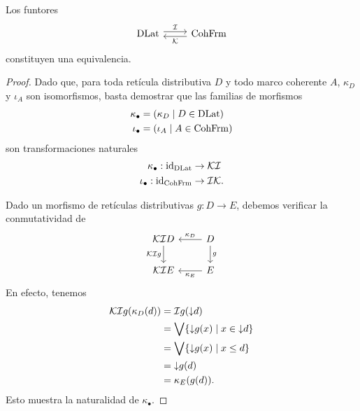 \begin{thm}
    Los funtores
    \[
        \begin{tikzcd}
            \DLat \ar[r,"\cal I",shift left] &
            \CohFrm \ar[l,"\cal K",shift left]
        \end{tikzcd}
    \]
    constituyen una equivalencia.
\end{thm}
\begin{proof}
    Dado que, para toda retícula distributiva $D$
    y todo marco coherente $A$,  $\kappa_D$ y $\iota_A$
    son isomorfismos, basta demostrar que las familias
    de morfismos
    \begin{align*}
        \kappa_\bullet &= (\kappa_D\mid D\in\mathrm{DLat}) \\
        \iota_\bullet &= (\iota_A\mid A\in\mathrm{CohFrm})
    \end{align*}
    son transformaciones naturales
    \begin{align*}
        \kappa_\bullet:\mathrm{id}_{\mathrm{DLat}} &\to\mathcal{K}\mathcal{I} \\
        \iota_\bullet:\mathrm{id}_{\mathrm{CohFrm}} &\to\mathcal{I}\mathcal{K}.
    \end{align*}
    
    Dado un morfismo de retículas distributivas
    $g:D\to E$, debemos verificar la conmutatividad de
    \[
        \begin{tikzcd}
            \cal K\cal ID \ar[d,"\cal K\cal I g"']
                & D \ar[l,"\kappa_D"'] \ar[d,"g"] \\
            \cal K\cal IE
                & E \ar[l,"\kappa_E"]
        \end{tikzcd}
    \]
    En efecto, tenemos
    \begin{align*}
        \mathcal{K}\mathcal{I}g(\kappa_D(d))
        &= \mathcal{I}g({\downarrow} d) \\
        &= \bigvee\{{\downarrow} g(x)\mid x\in{\downarrow} d\} \\
        &= \bigvee\{{\downarrow} g(x)\mid x\leq d\} \\
        &= {\downarrow} g(d) \\
        &= \kappa_E(g(d)).
    \end{align*}
    Esto muestra la naturalidad de $\kappa_\bullet$.
    

\end{proof}
